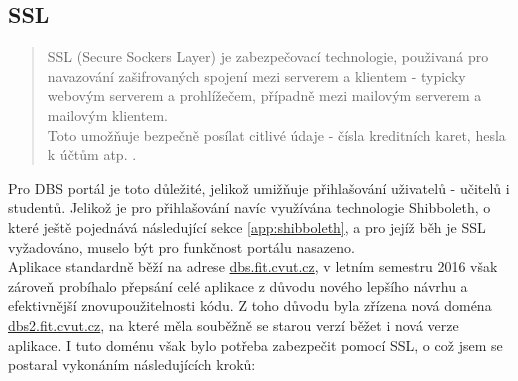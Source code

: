 \subsection{SSL}

\begin{quote}
SSL (Secure Sockers Layer) je zabezpečovací technologie, použivaná pro navazování zašifrovaných spojení mezi serverem a klientem - typicky webovým serverem a prohlížečem, případně mezi mailovým serverem a mailovým klientem.\\
Toto umožňuje bezpečně posílat citlivé údaje - čísla kreditních karet, hesla k účtům atp. \cite{ssl}.
\end{quote}
Pro DBS portál je toto důležité, jelikož umižňuje přihlašování uživatelů - učitelů i studentů. Jelikož je pro přihlašování navíc využívána technologie Shibboleth, o které ještě pojednává následující sekce \ref{app:shibboleth}, a pro jejíž běh je SSL vyžadováno, muselo být pro funkčnost portálu nasazeno.\\
Aplikace standardně běží na adrese \url{dbs.fit.cvut.cz}, v letním semestru 2016 však zároveň probíhalo přepsání celé aplikace z důvodu nového lepšího návrhu a efektivnější znovupoužitelnosti kódu. Z toho důvodu byla zřízena nová doména \url{dbs2.fit.cvut.cz}, na které měla souběžně se starou verzí běžet i nová verze aplikace. I tuto doménu však bylo potřeba zabezpečit pomocí SSL, o což jsem se postaral vykonáním následujících kroků:
